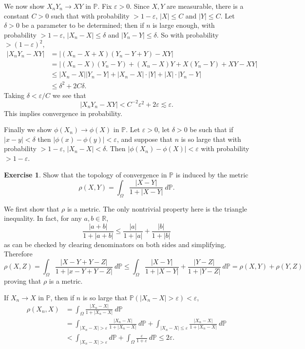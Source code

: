 \documentclass[10pt]{article}
\newcommand{\RR}{\mathbb{R}}
\newcommand{\PP}{\mathbb P}
\theoremstyle{definition}
\newtheorem{exer}{Exercise}
\begin{document}
We now show $X_nY_n \to XY$ in $\PP$. Fix $\varepsilon > 0$.
Since $X,Y$ are measurable, there is a constant $C > 0$ such that with probability $> 1 - \varepsilon$, $|X| \leq C$ and $|Y| \leq C$.
Let $\delta > 0$ be a parameter to be determined; then if $n$ is large enough, with probability $> 1 - \varepsilon$, $|X_n - X| \leq \delta$ and $|Y_n - Y| \leq \delta$.
So with probability $> (1 - \varepsilon)^2$,
\begin{align*}
|X_nY_n - XY| &= |(X_n - X + X)(Y_n - Y + Y) - XY| \\
&= |(X_n - X)(Y_n - Y) + (X_n - X)Y + X(Y_n - Y) + XY - XY| \\
&\leq |X_n - X||Y_n - Y| + |X_n - X|\cdot|Y| + |X|\cdot|Y_n - Y|\\
&\leq \delta^2 + 2C\delta.
\end{align*}
Taking $\delta < \varepsilon/C$ we see that
$$|X_nY_n - XY| < C^{-2}\varepsilon^2 + 2\varepsilon \lesssim \varepsilon.$$
This implies convergence in probability.

Finally we show $\phi(X_n) \to \phi(X)$ in $\PP$.
Let $\varepsilon > 0$, let $\delta > 0$ be such that if $|x - y| < \delta$ then $|\phi(x) - \phi(y)| < \varepsilon$, and suppose that $n$ is so large that with probability $> 1 - \varepsilon$, $|X_n - X| < \delta$.
Then $|\phi(X_n) - \phi(X)| < \varepsilon$ with probability $> 1 - \varepsilon$.

\begin{exer}
Show that the topology of convergence in $\PP$ is induced by the metric
$$\rho(X, Y) = \int_\Omega \frac{|X - Y|}{1 + |X - Y|} ~d\PP.$$
\end{exer}
We first show that $\rho$ is a metric. The only nontrivial property here is the triangle inequality.
In fact, for any $a, b\in \RR$,
$$\frac{|a + b|}{1 + |a+b|} \leq \frac{|a|}{1 + |a|} + \frac{|b|}{1 + |b|}$$
as can be checked by clearing denominators on both sides and simplifying.
Therefore
$$\rho(X, Z) = \int_\Omega \frac{|X - Y + Y - Z|}{1 + |x - Y + Y - Z|} ~d\PP \leq \int_\Omega \frac{|X - Y|}{1 + |X - Y|} + \frac{|Y - Z|}{1 + |Y - Z|}~d\PP = \rho(X, Y) + \rho(Y, Z)$$
proving that $\rho$ is a metric.

If $X_n \to X$ in $\PP$, then if $n$ is so large that $\PP(|X_n - X| > \varepsilon) < \varepsilon$,
\begin{align*}
\rho(X_n, X) &= \int_\Omega \frac{|X_n - X|}{1 + |X_n - X|}~d\PP\\ &= \int_{|X_n - X| > \varepsilon} \frac{|X_n - X|}{1 + |X_n - X|}~d\PP + \int_{|X_n - X| \leq \varepsilon} \frac{|X_n - X|}{1 + |X_n - X|}~d\PP \\
&< \int_{|X_n - X| > \varepsilon} d\PP + \int_\Omega \frac{\varepsilon}{1 + \varepsilon}~d\PP \leq 2\varepsilon.
\end{align*}
\end{document}
